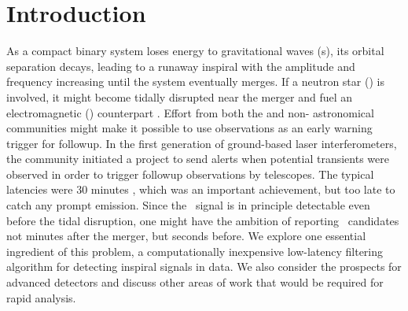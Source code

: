 \section{Introduction}
\label{sec:introduction}

As a compact binary system loses energy to gravitational waves (\GW{}s), its
orbital separation decays, leading to a runaway inspiral with the \GW{}
amplitude and frequency increasing until the system eventually merges.  If a
neutron star (\NS{}) is involved, it might become tidally disrupted near
the merger and fuel an electromagnetic (\EM{}) counterpart
\citep{shibata:2007}.  Effort from both the \GW{} and non-\GW{} astronomical communities might make it
possible to use \GW{} observations as an early warning trigger for \EM{}
followup. In the first generation of ground-based laser interferometers, the
\GW{} community initiated a project to send alerts when potential \GW{}
transients were observed in order to trigger followup observations by \EM{}
telescopes.  The typical latencies were 30 minutes \citep{HugheyGWPAW2011},
which was an important achievement, but too late to catch any prompt \EM{}
emission.  Since the \GW\ signal is in principle detectable even before the tidal
disruption, one might have the ambition of reporting \GW\ candidates not minutes
after the merger, but seconds before.  We explore one essential ingredient of this
problem, a computationally inexpensive low-latency filtering algorithm for detecting
inspiral signals in \GW{} data.  We also consider the prospects for advanced \GW{}
detectors and discuss other areas of work that would be required for rapid analysis.

